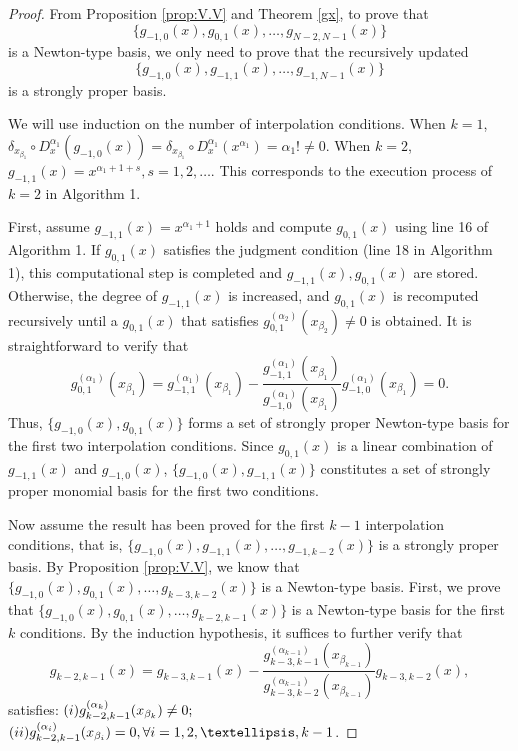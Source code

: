\documentclass[10pt,a4paper]{amsart}
\begin{document}
\begin{proof}
From Proposition \ref{prop:V.V} and Theorem \ref{gx}, to prove that
\begin{displaymath}
  \{g_{-1,0}(x), g_{0,1}(x), \dots, g_{N-2,N-1}(x)\}  
\end{displaymath}
is a Newton-type basis,
we only need to prove that the recursively updated
\begin{displaymath}
  \{g_{-1,0}(x), g_{-1,1}(x), \dots, g_{-1,N-1}(x)\}  
\end{displaymath}
 is a strongly proper basis.

We will use induction on the number of interpolation conditions.
When $k=1$, $ \delta_{x_{\beta_1}}\circ D_x^{\alpha_1}(g_{-1,0}(x))= \delta_{x_{\beta_1}}\circ D_x^{\alpha_1}(x^{\alpha_1})=\alpha_1!\neq 0.$
When $k=2$, $g_{-1,1}(x)=x^{\alpha_1+1+s}, s=1,2,\dots$. This corresponds to the execution process of $k=2$ in Algorithm 1. 

First, assume $g_{-1,1}(x)=x^{\alpha_1+1}$ holds and compute $g_{0,1}(x)$ using line 16 of Algorithm 1. If $g_{0,1}(x)$ satisfies the judgment condition (line 18 in Algorithm 1), this computational step is completed and
$g_{-1,1}(x),g_{0,1}(x)$ are stored. Otherwise, the degree of $g_{-1,1}(x)$ is increased, and 
$g_{0,1}(x)$ is recomputed recursively until a 
$g_{0,1}(x)$
 that satisfies 
$g_{0,1}^{(\alpha_2)}(x_{\beta_2})\neq 0$
 is obtained.
It is straightforward to verify that 
\begin{displaymath}
    g_{0,1}^{(\alpha_1)}(x_{\beta_1})=g_{-1,1}^{(\alpha_1)}(x_{\beta_1})-\frac{g_{-1,1}^{(\alpha_1)}(x_{\beta_1})}{g_{-1,0}^{(\alpha_1)}(x_{\beta_1})}g_{-1,0}^{(\alpha_1)}(x_{\beta_1})=0.
\end{displaymath} 
Thus, $\{g_{-1,0}(x),g_{0,1}(x)\}$ forms a set of strongly proper Newton-type basis for the first two interpolation conditions. Since $g_{0,1}(x)$ is a linear combination of $g_{-1,1}(x)$ and $g_{-1,0}(x)$, 
$\{g_{-1,0}(x),g_{-1,1}(x)\}$ constitutes a set of strongly proper monomial basis for the first two conditions.


Now assume the result has been proved for the first  $k-1$ interpolation conditions, that is,
$\{g_{-1,0}(x), g_{-1,1}(x), \dots, g_{-1,k-2}(x)\}$ is a strongly proper basis. By Proposition \ref{prop:V.V}, we know that $\{g_{-1,0}(x), g_{0,1}(x), \dots, g_{k-3,k-2}(x)\}$ is a Newton-type basis. 
First, we prove that $\{g_{-1,0}(x), g_{0,1}(x), \dots, g_{k-2,k-1}(x)\}$ is a Newton-type basis for the first $k$ conditions. By the induction hypothesis, it suffices to further verify that 
\begin{displaymath}
  g_{k-2,k-1}(x)=g_{k-3,k-1}(x)-\frac{g_{k-3,k-1}^{(\alpha_{k-1})}(x_{\beta_{k-1}})}{g_{k-3,k-2}^{(\alpha_{k-1})}(x_{\beta_{k-1}})}g_{k-3,k-2}(x) , 
\end{displaymath}
 satisfies: 
$\textup{(\romannumeral 1) }g_{k-2,k-1}^{(\alpha_k)}(x_{\beta_k})\neq 0;$ 
$\textup{(\romannumeral 2) }g_{k-2,k-1}^{(\alpha_i)}(x_{\beta_i})=0, \forall i=1,2,\dots,k-1$.


\end{proof}
\end{document}
